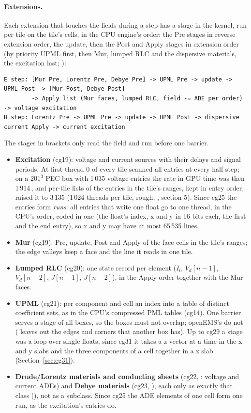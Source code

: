 \paragraph{Extensions.} Each extension that touches the fields during a step has a stage in the kernel, run per tile
on the tile's cells, in the CPU engine's order: the Pre stages in reverse extension order, the update, then the Post
and Apply stages in extension order (by priority UPML first, then Mur, lumped RLC and the dispersive materials, the
excitation last; ):
\begin{lstlisting}
E step: [Mur Pre, Lorentz Pre, Debye Pre] -> UPML Pre -> update -> UPML Post -> [Mur Post, Debye Post]
        -> Apply list (Mur faces, lumped RLC, field -= ADE per order) -> voltage excitation
H step: Lorentz Pre -> UPML Pre -> update -> UPML Post -> dispersive current Apply -> current excitation
\end{lstlisting}
The stages in brackets only read the field and run before one barrier.
\begin{itemize}
\item \textbf{Excitation} (cg19): voltage and current sources with their delays and signal periods. At first thread 0
  of every tile scanned all entries at every half step; on a $201^3$ PEC box with 1\,035 voltage entries the rate in
  GPU time was then 1\,914\,\MC, and per-tile lists of the entries in the tile's ranges, kept in entry order, raised it
  to 3\,135 (1\,024 threads per tile, rough; , section 5). Since cg25 the entries
  form \emph{runs}: all entries that write one float go to one thread, in the CPU's order, coded in one 
  (the float's index, x and y in 16 bits each, the first and the end entry), so x and y may have at most 65\,535 lines.
\item \textbf{Mur} (cg19): Pre, update, Post and Apply of the face cells in the tile's ranges; the edge valleys keep a
  face and the line it reads in one tile.
\item \textbf{Lumped RLC} (cg20): one state record per element ($I_l$, $V_d[n-1]$, $V_d[n-2]$, $J[n-1]$, $J[n-2]$), in
  the Apply order together with the Mur faces.
\item \textbf{UPML} (cg21): per component and cell an index into a table of distinct coefficient sets, as in the
  CPU's compressed PML tables (cg14). One barrier serves a stage of all boxes, so the boxes must not overlap; openEMS's
  do not ( leaves out the edges and corners that another box has). Up to cg29 a stage was a loop
  over single floats; since cg31 it takes a z-vector at a time in the x and y slabs and the three components of a
  cell together in a z slab (Section~\ref{sec:cg31}).
\item \textbf{Drude/Lorentz materials and conducting sheets} (cg22, : voltage and
  current ADEs) and \textbf{Debye materials} (cg23, ), each only as exactly that
  class (), not as a subclass. Since cg25 the ADE elements of one cell form one run, as the excitation's
  entries do.
\end{itemize}
